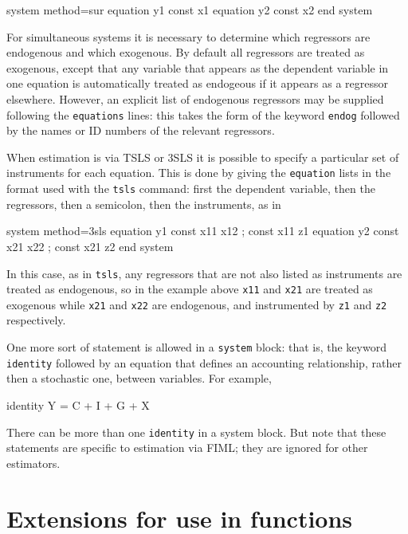 \begin{code}
system method=sur
  equation y1 const x1
  equation y2 const x2
end system
\end{code}

For simultaneous systems it is necessary to determine which regressors
are endogenous and which exogenous. By default all regressors are
treated as exogenous, except that any variable that appears as the
dependent variable in one equation is automatically treated as
endogeous if it appears as a regressor elsewhere. However, an explicit
list of endogenous regressors may be supplied following the
\texttt{equations} lines: this takes the form of the keyword
\texttt{endog} followed by the names or ID numbers of the relevant
regressors.

When estimation is via TSLS or 3SLS it is possible to specify a
particular set of instruments for each equation. This is done by
giving the \texttt{equation} lists in the format used with the
\texttt{tsls} command: first the dependent variable, then the
regressors, then a semicolon, then the instruments, as in

\begin{code}
system method=3sls
  equation y1 const x11 x12 ; const x11 z1
  equation y2 const x21 x22 ; const x21 z2
end system
\end{code}

In this case, as in \texttt{tsls}, any regressors that are not also
listed as instruments are treated as endogenous, so in the example
above \texttt{x11} and \texttt{x21} are treated as exogenous while
\texttt{x21} and \texttt{x22} are endogenous, and instrumented by
\texttt{z1} and \texttt{z2} respectively.

One more sort of statement is allowed in a \texttt{system} block: that
is, the keyword \texttt{identity} followed by an equation that defines
an accounting relationship, rather then a stochastic one, between
variables. For example,

\begin{code}
  identity Y = C + I + G + X
\end{code}

There can be more than one \texttt{identity} in a system block. But
note that these statements are specific to estimation via FIML; they
are ignored for other estimators.

\section{Extensions for use in functions}
\label{sec:system-functions}

